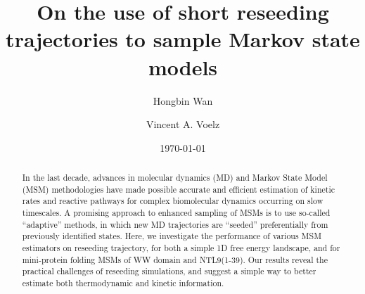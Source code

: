 \documentclass[%
 aip,
rsi,%
 amsmath,amssymb,
 reprint,%
]{revtex4-1}
\begin{document}

\title[Sample title]{On the use of short reseeding trajectories to sample Markov state models}%


\author{Hongbin Wan}
\author{Vincent A. Voelz}


\date{\today}%

\begin{abstract}
In the last decade, advances in molecular dynamics (MD) and Markov State Model (MSM) methodologies have made possible accurate and efficient estimation of kinetic rates and reactive pathways for complex biomolecular dynamics occurring on slow timescales.  A promising approach to enhanced sampling of MSMs is to use so-called “adaptive” methods, in which new MD trajectories are “seeded” preferentially from previously identified states.  Here, we investigate the performance of various MSM estimators on reseeding trajectory, for both a simple 1D free energy landscape, and for mini-protein folding MSMs of WW domain and NTL9(1-39).  Our results reveal the practical challenges of reseeding simulations, and suggest a simple way to better estimate both thermodynamic and kinetic information.
\end{abstract}

\maketitle

\end{document}
